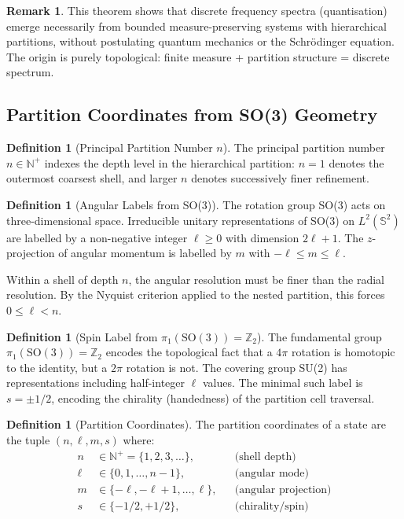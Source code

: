 \documentclass[11pt,twocolumn,a4paper]{article}
\theoremstyle{definition}
\newtheorem{definition}[theorem]{Definition}
\newtheorem{remark}[theorem]{Remark}
\begin{document}
\begin{remark}
This theorem shows that discrete frequency spectra (quantisation) emerge necessarily from bounded measure-preserving systems with hierarchical partitions, without postulating quantum mechanics or the Schrödinger equation. The origin is purely topological: finite measure + partition structure = discrete spectrum.
\end{remark}

\subsection{Partition Coordinates from SO(3) Geometry}

\begin{definition}[Principal Partition Number $n$]
The principal partition number $n \in \mathbb{N}^+$ indexes the depth level in the hierarchical partition: $n=1$ denotes the outermost coarsest shell, and larger $n$ denotes successively finer refinement.
\end{definition}

\begin{definition}[Angular Labels from SO(3)]
The rotation group SO(3) acts on three-dimensional space. Irreducible unitary representations of SO(3) on $L^2(\mathbb{S}^2)$ are labelled by a non-negative integer $\ell \geq 0$ with dimension $2\ell+1$. The $z$-projection of angular momentum is labelled by $m$ with $-\ell \leq m \leq \ell$.

Within a shell of depth $n$, the angular resolution must be finer than the radial resolution. By the Nyquist criterion applied to the nested partition, this forces $0 \leq \ell < n$.
\end{definition}

\begin{definition}[Spin Label from $\pi_1(\text{SO}(3)) = \mathbb{Z}_2$]
The fundamental group $\pi_1(\text{SO}(3)) = \mathbb{Z}_2$ encodes the topological fact that a $4\pi$ rotation is homotopic to the identity, but a $2\pi$ rotation is not. The covering group SU(2) has representations including half-integer $\ell$ values. The minimal such label is $s = \pm 1/2$, encoding the chirality (handedness) of the partition cell traversal.
\end{definition}

\begin{definition}[Partition Coordinates]
\label{def:partition-coords}
The partition coordinates of a state are the tuple $(n, \ell, m, s)$ where:
\begin{align*}
n &\in \mathbb{N}^+ = \{1,2,3,\ldots\}, & & \text{(shell depth)} \\
\ell &\in \{0,1,\ldots,n-1\}, & & \text{(angular mode)} \\
m &\in \{-\ell, -\ell+1, \ldots, \ell\}, & & \text{(angular projection)} \\
s &\in \{-1/2, +1/2\}, & & \text{(chirality/spin)}
\end{align*}
\end{definition}
\end{document}
